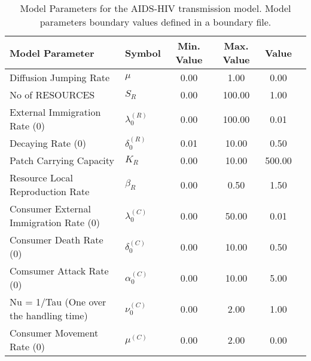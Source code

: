 \begin{table}
\centering
\begin{tabular}{p{5cm}lcccc}
{\bf Model Parameter} & {\bf Symbol} & {\bf Min. Value} & {\bf Max. Value} & {\bf Value}\\
\hline\hline
Diffusion Jumping Rate & $\mu$ & 0.00 & 1.00 & 0.00\\
No of RESOURCES & $S_R$ & 0.00 & 100.00 & 1.00\\
External Immigration Rate (0) & $\lambda^{(R)}_0$ & 0.00 & 100.00 & 0.01\\
Decaying Rate (0) & $\delta^{(R)}_0$ & 0.01 & 10.00 & 0.50\\
Patch Carrying Capacity & $K_R$ & 0.00 & 10.00 & 500.00\\
Resource Local Reproduction Rate & $\beta_R$ & 0.00 & 0.50 & 1.50\\
Consumer External Immigration Rate (0) & $\lambda^{(C)}_0$ & 0.00 & 50.00 & 0.01\\
Consumer Death Rate (0) & $\delta^{(C)}_0$ & 0.00 & 10.00 & 0.50\\
Comsumer Attack Rate (0) & $\alpha^{(C)}_0$ & 0.00 & 10.00 & 5.00\\
Nu = 1/Tau (One over the handling time) & $\nu^{(C)}_0$ & 0.00 & 2.00 & 1.00\\
Consumer Movement Rate (0) & $\mu^{(C)}$ & 0.00 & 2.00 & 0.00\\
\hline\hline
\end{tabular}
\caption{Model Parameters for the AIDS-HIV transmission model. Model parameters boundary values defined in a boundary file.}
\end{table}
